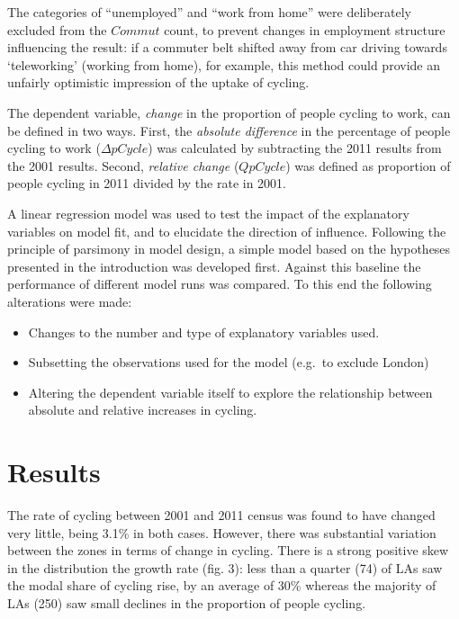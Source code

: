 The categories of ``unemployed'' and ``work from home'' were
deliberately excluded from the $Commut$ count, to prevent changes in
employment structure influencing the result: if a commuter belt shifted
away from car driving towards `teleworking' (working from home), for
example, this method could provide an unfairly optimistic impression of
the uptake of cycling.

The dependent variable, \emph{change} in the proportion of people
cycling to work, can be defined in two ways. First, the \emph{absolute
difference} in the percentage of people cycling to work
($\Delta pCycle$) was calculated by subtracting the 2011 results from
the 2001 results. Second, \emph{relative change} ($Q pCycle$) was
defined as proportion of people cycling in 2011 divided by the rate in
2001.

A linear regression model was used to test the impact of the explanatory
variables on model fit, and to elucidate the direction of influence.
Following the principle of parsimony in model design, a simple model
based on the hypotheses presented in the introduction was developed
first. Against this baseline the performance of different model runs was
compared. To this end the following alterations were made:

\begin{itemize}
\itemsep1pt\parskip0pt
\item
  Changes to the number and type of explanatory variables used.
\item
  Subsetting the observations used for the model (e.g.~to exclude
  London)
\item
  Altering the dependent variable itself to explore the relationship
  between absolute and relative increases in cycling.
\end{itemize}

\section{Results}\label{results}

The rate of cycling between 2001 and 2011 census was found to have
changed very little, being 3.1\% in both cases. However, there was
substantial variation between the zones in terms of change in cycling.
There is a strong positive skew in the distribution the growth rate
(fig. 3): less than a quarter (74) of LAs saw the modal share of cycling
rise, by an average of 30\% whereas the majority of LAs (250) saw small
declines in the proportion of people cycling.

